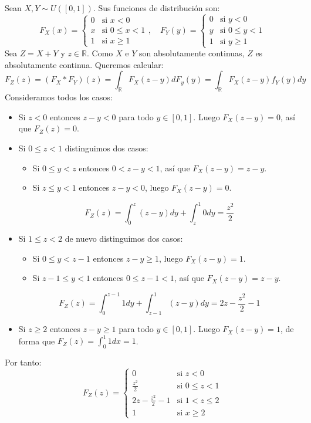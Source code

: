 \begin{example}
    Sean $X, Y \sim U([0, 1])$. Sus funciones de distribución son:
    $$F_X(x) = \begin{cases}
            0 & \text{si } x < 0        \\
            x & \text{si } 0 \leq x < 1 \\
            1 & \text{si } x \geq 1
        \end{cases}, \quad
        F_Y(y) = \begin{cases}
            0 & \text{si } y < 0        \\
            y & \text{si } 0 \leq y < 1 \\
            1 & \text{si } y \geq 1
        \end{cases}$$
    Sea $Z = X+Y$ y $z \in \mathbb{R}$.
    Como $X$ e $Y$ son absolutamente continuas, $Z$ es absolutamente continua.
    Queremos calcular:
    $$F_Z(z) = (F_X \ast F_Y)(z) = \int_\mathbb{R} F_X(z-y)dF_y(y) = \int_\mathbb{R} F_X(z-y) f_Y(y) dy$$
    Consideramos todos los casos:
    \begin{itemize}
        \item Si $z < 0$ entonces $z-y<0$ para todo $y \in [0, 1]$.
              Luego $F_X(z-y) = 0$, así que $F_Z(z) = 0$.
        \item Si $0 \leq z < 1$ distinguimos dos casos:
              \begin{itemize}
                  \item Si $0 \leq y < z$ entonces $0 < z-y < 1$, así que $F_X(z-y) = z-y$.
                  \item Si $z \leq y < 1$ entonces $z-y < 0$, luego $F_X(z-y) = 0$.
              \end{itemize}
              $$F_Z(z) = \int_0^z (z-y) dy + \int_z^1 0 dy = \frac{z^2}{2}$$
        \item Si $1 \leq z < 2$ de nuevo distinguimos dos casos:
              \begin{itemize}
                  \item Si $0 \leq y < z-1$ entonces $z-y \geq 1$, luego $F_X(z-y) = 1$.
                  \item Si $z-1 \leq y < 1$ entonces $0 \leq z-1 < 1$, así que $F_X(z-y) = z-y$.
              \end{itemize}
              $$F_Z(z) = \int_0^{z-1} 1 dy + \int_{z-1}^1 (z-y) dy = 2z - \frac{z^2}{2} - 1$$
        \item Si $z \geq 2$ entonces $z-y \geq 1$ para todo $y \in [0, 1]$.
              Luego $F_X(z-y) = 1$, de forma que $F_Z(z) = \int_0^1 1 dx = 1$.
    \end{itemize}
    Por tanto:
    $$F_Z(z) = \begin{cases}
            0                      & \text{si } z < 0        \\
            \frac{z^2}{2}          & \text{si } 0 \leq z < 1 \\
            2z - \frac{z^2}{2} - 1 & \text{si } 1 < z \leq 2 \\
            1                      & \text{si } x \geq 2
        \end{cases}$$
\end{example}


